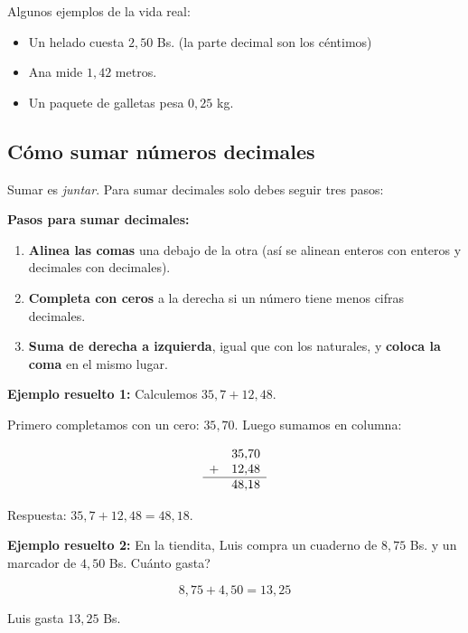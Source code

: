 \documentclass[12pt, letterpaper]{article}
\begin{document}
\noindent Algunos ejemplos de la vida real:
\begin{itemize}[leftmargin=*]
  \item Un helado cuesta $2{,}50$ Bs. (la parte decimal son los céntimos)
  \item Ana mide $1{,}42$ metros.
  \item Un paquete de galletas pesa $0{,}25$ kg.
\end{itemize}
\newpage
\subsection{Cómo sumar números decimales}

Sumar es \emph{juntar}. Para sumar decimales solo debes seguir tres pasos:

\begin{cuadropasos}
  \textbf{Pasos para sumar decimales:}
  \begin{enumerate}
    \item \textbf{Alinea las comas} una debajo de la otra (así se alinean enteros con enteros y decimales con decimales).
    \item \textbf{Completa con ceros} a la derecha si un número tiene menos cifras decimales.
    \item \textbf{Suma de derecha a izquierda}, igual que con los naturales, y \textbf{coloca la coma} en el mismo lugar.
  \end{enumerate}
\end{cuadropasos}

\noindent\textbf{Ejemplo resuelto 1:} Calculemos $35{,}7 + 12{,}48$.

Primero completamos con un cero: $35{,}70$. Luego sumamos en columna:

\[
  \begin{array}{rr}
      & 35{,}70 \\
    + & 12{,}48 \\ \hline
      & 48{,}18
  \end{array}
\]

\noindent Respuesta: $35{,}7 + 12{,}48 = 48{,}18$.

\noindent\textbf{Ejemplo resuelto 2:} En la tiendita, Luis compra un cuaderno de $8{,}75$ Bs. y un marcador de $4{,}50$ Bs. \textquestiondown Cuánto gasta?

\[
  8{,}75 + 4{,}50 = 13{,}25
\]

\noindent Luis gasta $13{,}25$ Bs.
\end{document}
